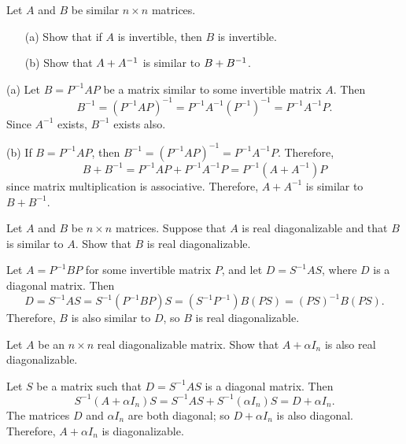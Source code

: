 \documentclass{ximera}
\begin{document}
\begin{exercise} \label{c10.3.4}
Let $A$ and $B$ be similar $n\times n$ matrices.
\begin{itemize}
\item[(a)]  Show that if $A$ is invertible, then $B$ is invertible.
\item[(b)]  Show that $A+A^{-1}$ is similar to $B+B^{-1}$.
\end{itemize}

\begin{solution}

(a) Let $B = P^{-1}AP$ be a matrix similar to some invertible matrix $A$.
Then 
\[
B^{-1} = (P^{-1}AP)^{-1} = P^{-1}A^{-1}(P^{-1})^{-1} = P^{-1}A^{-1}P.
\]
Since $A^{-1}$ exists, $B^{-1}$ exists also.

(b) If $B = P^{-1}AP$, then $B^{-1} = (P^{-1}AP)^{-1} = P^{-1}A^{-1}P$.
Therefore,
\[
B + B^{-1} = P^{-1}AP + P^{-1}A^{-1}P = P^{-1}(A + A^{-1})P
\]
since matrix multiplication is associative.  Therefore, $A + A^{-1}$ is
similar to $B + B^{-1}$.

\end{solution}
\end{exercise}

\begin{exercise} \label{c10.3.5}
Let $A$ and $B$ be $n\times n$ matrices.  Suppose that $A$ is real 
diagonalizable and that $B$ is similar to $A$.  Show that $B$ is 
real diagonalizable.

\begin{solution}

Let $A = P^{-1}BP$ for some invertible matrix $P$, and let
$D = S^{-1}AS$, where $D$ is a diagonal matrix.  Then
\[
D = S^{-1}AS = S^{-1}(P^{-1}BP)S = (S^{-1}P^{-1})B(PS) = 
(PS)^{-1}B(PS).
\]
Therefore, $B$ is also similar to $D$, so $B$ is real diagonalizable.

\end{solution}
\end{exercise}

\begin{exercise} \label{c10.3.6}
Let $A$ be an $n\times n$ real diagonalizable matrix. Show that $A+\alpha I_n$
is also real diagonalizable.

\begin{solution}

Let $S$ be a matrix such that $D = S^{-1}AS$ is a diagonal matrix.
Then
\[
S^{-1}(A + \alpha I_n)S = S^{-1}AS + S^{-1}(\alpha I_n)S =
D + \alpha I_n.
\]
The matrices $D$ and $\alpha I_n$ are both diagonal; so $D + \alpha I_n$
is also diagonal.  Therefore, $A + \alpha I_n$ is diagonalizable.


\end{solution}
\end{exercise}
\end{document}
